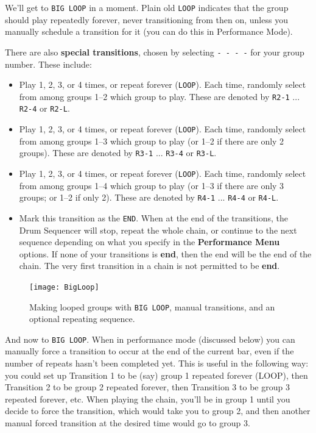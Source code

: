 \documentclass{article}
\begin{document}
We'll get to {\tt BIG LOOP} in a moment.  Plain old {\tt LOOP} indicates that the group should play repeatedly forever, never transitioning from then on, unless you manually schedule a transition for it (you can do this in Performance Mode).  

There are also {\bf special transitions}, chosen by selecting {\tt - - - -} for your group number.  These include:

\begin{itemize}
\item Play 1, 2, 3, or 4 times, or repeat forever (\texttt{LOOP}).  Each time, randomly select from among groups 1--2 which group to play.  These are denoted by {\tt R2-1} ... {\tt R2-4} or {\tt R2-L}.
\item Play 1, 2, 3, or 4 times, or repeat forever (\texttt{LOOP}).  Each time, randomly select from among groups 1--3 which group to play (or 1--2 if there are only 2 groups).  These are denoted by {\tt R3-1} ... {\tt R3-4}  or {\tt R3-L}.
\item Play 1, 2, 3, or 4 times, or repeat forever (\texttt{LOOP}).  Each time, randomly select from among groups 1--4 which group to play (or 1--3 if there are only 3 groups; or 1--2 if only 2).  These are denoted by {\tt R4-1} ... {\tt R4-4} or {\tt R4-L}.
\item Mark this transition as the {\texttt{END}}.  When at the end of the transitions, the Drum Sequencer will stop, repeat the whole chain, or continue to the next sequence depending on what you specify in the {\bf Performance Menu} options.  If none of your transitions is {\bf end}, then the end will be the end of the chain.   The very first transition in a chain is not permitted to be {\bf end}.
\end{itemize}

\begin{figure}[t]
\centering\texttt{[image: BigLoop]}
\caption{Making looped groups with {\tt BIG LOOP}, manual transitions, and an optional repeating sequence.}
\vspace{-1em}
\label{bigloop}
\end{figure}

And now to {\tt BIG LOOP}.  When in performance mode (discussed below) you can manually force a transition to occur at the end of the current bar, even if the number of repeats hasn't been completed yet.  This is useful in the following way: you could set up Transition 1 to be (say) group 1 repeated forever (LOOP), then Transition 2 to be group 2 repeated forever, then Transition 3 to be group 3 repeated forever, etc.  When playing the chain, you'll be in group 1 until you decide to force the transition, which would take you to group 2, and then another manual forced transition at the desired time would go to group 3.
\end{document}
